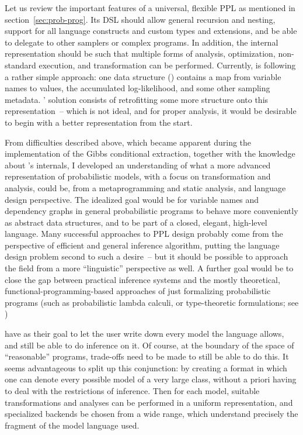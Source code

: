 Let us review the important features of a universal, flexible PPL as mentioned in
section~\ref{sec:prob-prog}.  Its DSL should allow general recursion and nesting, support for all
language constructs and custom types and extensions, and be able to delegate to other samplers or
complex programs.  In addition, the internal representation should be such that multiple forms of
analysis, optimization, non-standard execution, and transformation can be performed.  Currently,
\turingjl{} is following a rather simple approach: one data structure () contains a
map from variable names to values, the accumulated log-likelihood, and some other sampling
metadata. \autogibbsjl{}' solution consists of retrofitting some more structure onto this
representation~-- which is not ideal, and for proper analysis, it would be desirable to begin with a
better representation from the start.

From difficulties described above, which became apparent during the implementation of the Gibbs
conditional extraction, together with the knowledge about \dppljl{}'s internals, I developed an
understanding of what a more advanced representation of probabilistic models, with a focus on
transformation and analysis, could be, from a metaprogramming and static analysis, and language
design perspective.  The idealized goal would be for variable names and dependency graphs in general
probabilistic programs to behave more conveniently as abstract data structures, and to be part of a
closed, elegant, high-level language.  Many successful approaches to PPL design probably come from
the perspective of efficient and general inference algorithm, putting the language design problem
second to such a desire~-- but it should be possible to approach the field from a more
\enquote{linguistic} perspective as well.  A further goal would be to close the gap between
practical inference systems and the mostly theoretical, functional-programming-based approaches of
just formalizing probabilistic programs (such as probabilistic lambda calculi, or type-theoretic
formulations; see
\textcite{ramsey2002stochastic,heunen2017convenient,bhat2012type,scibior2015practical})

 have as their goal to let the user write down every model the language
allows, and still be able to do inference on it.  Of course, at the boundary of the space of
\enquote{reasonable} programs, trade-offs need to be made to still be able to do this.  It seems
advantageous to split up this conjunction: by creating a format in which one can denote every
possible model of a very large class, without a priori having to deal with the restrictions of
inference.  Then for each model, suitable transformations and analyses can be performed in a uniform
representation, and specialized backends be chosen from a wide range, which understand precisely the
fragment of the model language used.

